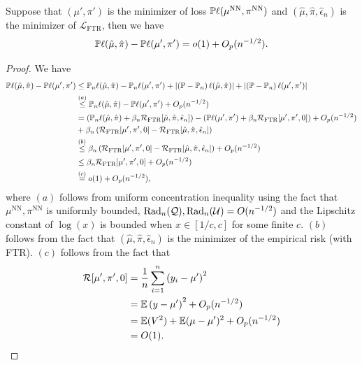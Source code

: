 \begin{lemma}\label{lemma_appendix:ell}
Suppose that $(\mu',\pi')$ is the minimizer of loss $\P\ell(\mu^{\text{NN}},\pi^{\text{NN}})$
and $(\hat{\mu},\hat{\pi},\hat{\epsilon}_{n})$ is the minimizer of
$\mathcal{L}_{\text{FTR}}$, then we have
$$\P\ell(\hat{\mu},\hat{\pi})-\P\ell(\mu',\pi') = o(1)+\O_{p}(n^{-1/2}).$$
\end{lemma}
\begin{proof}
We have
\begin{align*}
\P\ell(\hat{\mu},\hat{\pi})-\P\ell(\mu',\pi') & \le\P_{n}\ell(\hat{\mu},\hat{\pi})-\P_n\ell(\mu',\pi')+\left|\left(\P-\P_{n}\right)\ell(\hat{\mu},\hat{\pi})\right|+\left|\left(\P-\P_{n}\right)\ell(\mu',\pi')\right|\\
 & \overset{(a)}{\le}\P_{n}\ell(\hat{\mu},\hat{\pi})-\P\ell(\mu',\pi')+\O_{p}(n^{-1/2})\\
 & =\left(\P_{n}\ell(\hat{\mu},\hat{\pi})+\beta_{n}\mathcal{R}_{\text{FTR}}[\hat{\mu},\hat{\pi},\hat{\epsilon}_{n}]\right)-\left(\P\ell(\mu',\pi')+\beta_{n}\mathcal{R}_{\text{FTR}}[\mu',\pi',0]\right)+\O_{p}(n^{-1/2})\\
 & +\beta_{n}\left(\mathcal{R}_{\text{FTR}}[\mu',\pi',0]-\mathcal{R}_{\text{FTR}}[\hat{\mu},\hat{\pi},\hat{\epsilon}_{n}]\right)\\
 & \overset{(b)}{\le}\beta_{n}\left(\mathcal{R}_{\text{FTR}}[\mu',\pi',0]-\mathcal{R}_{\text{FTR}}[\hat{\mu},\hat{\pi},\hat{\epsilon}_{n}]\right)+\O_{p}(n^{-1/2})\\
 & \le\beta_{n}\mathcal{R}_{\text{FTR}}[\mu',\pi',0]+\O_{p}(n^{-1/2})\\
 & \overset{(c)}{=}o(1)+\O_{p}(n^{-1/2}),
\end{align*}
where $(a)$ follows from uniform concentration inequality using the fact that $\mu^{\text{NN}},\pi^{\text{NN}}$
is uniformly bounded, $\text{Rad}_{n}(\mathcal{Q}),\text{Rad}_{n}(\mathcal{U})=\O(n^{-1/2})$
and the Lipschitz constant of $\log(x)$ is bounded when $x\in[1/c,c]$
for some finite $c$. $(b)$ follows from the fact that $(\hat{\mu},\hat{\pi},\hat{\epsilon}_{n})$
is the minimizer of the empirical risk (with FTR). $(c)$ follows from the fact that
\begin{align*}
\mathcal{R}[\mu',\pi',0] & =\frac{1}{n}\sum_{i=1}^{n}\left(y_{i}-\mu'\right)^{2}\\
 & =\E\left(y-\mu'\right)^{2}+\O_{p}(n^{-1/2})\\
 & =\E(V^{2})+\E(\mu-\mu')^{2}+\O_{p}(n^{-1/2})\\
 & =\O(1).
\end{align*}
\end{proof}

